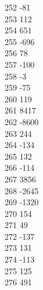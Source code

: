 { 252	-81 \\
 253	112 \\
 254	651 \\
 255	-696 \\
 256	78 \\
 257	-100 \\
 258	-3 \\
 259	-75 \\
 260	119 \\
 261	8417 \\
 262	-8600 \\
 263	244 \\
 264	-134 \\
 265	132 \\
 266	-114 \\
 267	3856 \\
 268	-2645 \\
 269	-1320 \\
 270	154 \\
 271	49 \\
 272	-137 \\
 273	131 \\
 274	-113 \\
 275	125 \\
 276	491 \\
}
